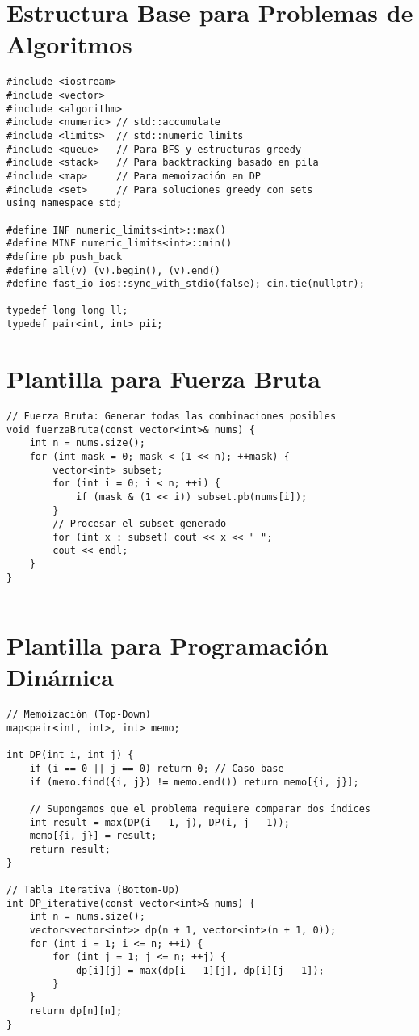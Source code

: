 \section{Estructura Base para Problemas de Algoritmos}

\begin{lstlisting}[style=cpp]
#include <iostream>
#include <vector>
#include <algorithm>
#include <numeric> // std::accumulate
#include <limits>  // std::numeric_limits
#include <queue>   // Para BFS y estructuras greedy
#include <stack>   // Para backtracking basado en pila
#include <map>     // Para memoización en DP
#include <set>     // Para soluciones greedy con sets
using namespace std;

#define INF numeric_limits<int>::max()
#define MINF numeric_limits<int>::min()
#define pb push_back
#define all(v) (v).begin(), (v).end()
#define fast_io ios::sync_with_stdio(false); cin.tie(nullptr);

typedef long long ll;
typedef pair<int, int> pii;

\end{lstlisting}


\section{Plantilla para Fuerza Bruta}

\begin{lstlisting}[style=cpp]
// Fuerza Bruta: Generar todas las combinaciones posibles
void fuerzaBruta(const vector<int>& nums) {
    int n = nums.size();
    for (int mask = 0; mask < (1 << n); ++mask) {
        vector<int> subset;
        for (int i = 0; i < n; ++i) {
            if (mask & (1 << i)) subset.pb(nums[i]);
        }
        // Procesar el subset generado
        for (int x : subset) cout << x << " ";
        cout << endl;
    }
}


\end{lstlisting}

\section{Plantilla para Programación Dinámica}

\begin{lstlisting}[style=cpp]
// Memoización (Top-Down)
map<pair<int, int>, int> memo;

int DP(int i, int j) {
    if (i == 0 || j == 0) return 0; // Caso base
    if (memo.find({i, j}) != memo.end()) return memo[{i, j}];
    
    // Supongamos que el problema requiere comparar dos índices
    int result = max(DP(i - 1, j), DP(i, j - 1));
    memo[{i, j}] = result;
    return result;
}

// Tabla Iterativa (Bottom-Up)
int DP_iterative(const vector<int>& nums) {
    int n = nums.size();
    vector<vector<int>> dp(n + 1, vector<int>(n + 1, 0));
    for (int i = 1; i <= n; ++i) {
        for (int j = 1; j <= n; ++j) {
            dp[i][j] = max(dp[i - 1][j], dp[i][j - 1]);
        }
    }
    return dp[n][n];
}


\end{lstlisting}

